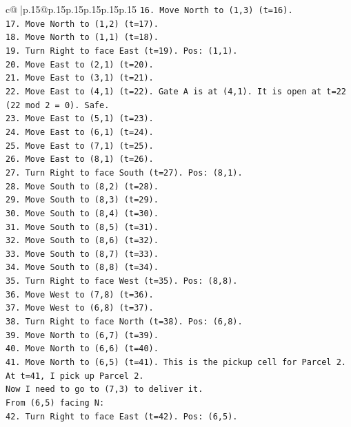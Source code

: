 \documentclass{article}
\begin{document}
{\begin{supertabular}{c@{$\;$}|p{.15\linewidth}@{}p{.15\linewidth}p{.15\linewidth}p{.15\linewidth}p{.15\linewidth}p{.15\linewidth}}
{{{\texttt{16. Move North to (1,3) (t=16).} \\
\texttt{17. Move North to (1,2) (t=17).} \\
\texttt{18. Move North to (1,1) (t=18).} \\
\texttt{19. Turn Right to face East (t=19). Pos: (1,1).} \\
\texttt{20. Move East to (2,1) (t=20).} \\
\texttt{21. Move East to (3,1) (t=21).} \\
\texttt{22. Move East to (4,1) (t=22). Gate A is at (4,1). It is open at t=22 (22 mod 2 = 0). Safe.} \\
\texttt{23. Move East to (5,1) (t=23).} \\
\texttt{24. Move East to (6,1) (t=24).} \\
\texttt{25. Move East to (7,1) (t=25).} \\
\texttt{26. Move East to (8,1) (t=26).} \\
\texttt{27. Turn Right to face South (t=27). Pos: (8,1).} \\
\texttt{28. Move South to (8,2) (t=28).} \\
\texttt{29. Move South to (8,3) (t=29).} \\
\texttt{30. Move South to (8,4) (t=30).} \\
\texttt{31. Move South to (8,5) (t=31).} \\
\texttt{32. Move South to (8,6) (t=32).} \\
\texttt{33. Move South to (8,7) (t=33).} \\
\texttt{34. Move South to (8,8) (t=34).} \\
\texttt{35. Turn Right to face West (t=35). Pos: (8,8).} \\
\texttt{36. Move West to (7,8) (t=36).} \\
\texttt{37. Move West to (6,8) (t=37).} \\
\texttt{38. Turn Right to face North (t=38). Pos: (6,8).} \\
\texttt{39. Move North to (6,7) (t=39).} \\
\texttt{40. Move North to (6,6) (t=40).} \\
\texttt{41. Move North to (6,5) (t=41). This is the pickup cell for Parcel 2.} \\
\texttt{At t=41, I pick up Parcel 2.} \\
\texttt{Now I need to go to (7,3) to deliver it.} \\
\texttt{From (6,5) facing N:} \\
\texttt{42. Turn Right to face East (t=42). Pos: (6,5).} \\
}}}
\end{supertabular}}
\end{document}
